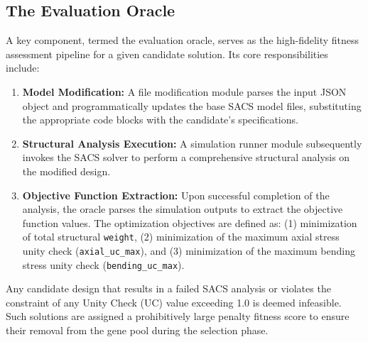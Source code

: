 \documentclass[preprint,12pt]{elsarticle}
\begin{document}
\subsection{The Evaluation Oracle}
A key component, termed the evaluation oracle, serves as the high-fidelity fitness assessment pipeline for a given candidate solution. Its core responsibilities include:
\begin{enumerate}
    \item \textbf{Model Modification:} A file modification module parses the input JSON object and programmatically updates the base SACS model files, substituting the appropriate code blocks with the candidate's specifications.
    \item \textbf{Structural Analysis Execution:} A simulation runner module subsequently invokes the SACS solver to perform a comprehensive structural analysis on the modified design.
    \item \textbf{Objective Function Extraction:} Upon successful completion of the analysis, the oracle parses the simulation outputs to extract the objective function values. The optimization objectives are defined as: (1) minimization of total structural \texttt{weight}, (2) minimization of the maximum axial stress unity check (\texttt{axial\_uc\_max}), and (3) minimization of the maximum bending stress unity check (\texttt{bending\_uc\_max}).
\end{enumerate}
Any candidate design that results in a failed SACS analysis or violates the constraint of any Unity Check (UC) value exceeding 1.0 is deemed infeasible. Such solutions are assigned a prohibitively large penalty fitness score to ensure their removal from the gene pool during the selection phase.
\end{document}
